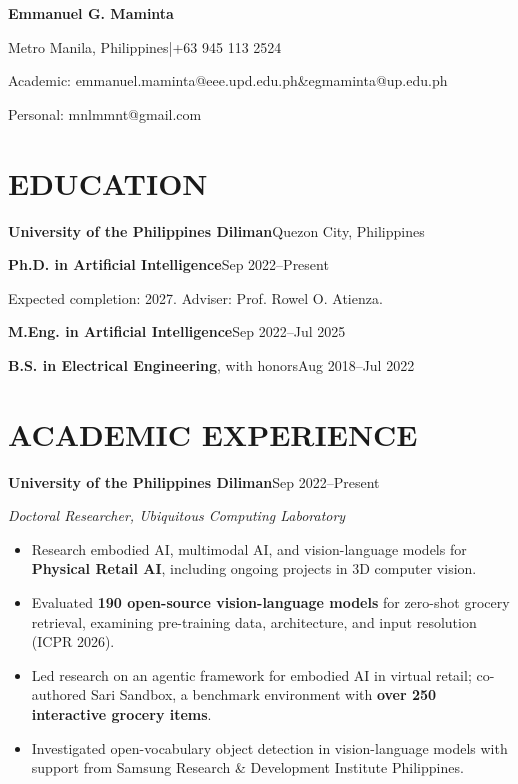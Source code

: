 \documentclass[11pt,a4paper]{article}
\newcommand{\dated}[2]{\textbf{#1}\hfill #2\par}
\newcommand{\role}[3]{\Needspace{4\baselineskip}\dated{#1}{#2}\textit{#3}\par}
\begin{document}
\fontsize{11}{13.2}\selectfont
\raggedright
{}

\begin{center}
  \textbf{Emmanuel G. Maminta}\par
  Metro Manila, Philippines\enspace |\enspace +63 945 113 2524\par
  Academic: emmanuel.maminta@eee.upd.edu.ph\enspace \&\enspace egmaminta@up.edu.ph\par
  Personal: mnlmmnt@gmail.com\par
\end{center}
\vspace{-3pt}

\section{EDUCATION}
\dated{University of the Philippines Diliman}{Quezon City, Philippines}
\textbf{Ph.D. in Artificial Intelligence}\hfill Sep 2022–Present\par
Expected completion: 2027. Adviser: Prof. Rowel O. Atienza.\par
\vspace{3pt}
\textbf{M.Eng. in Artificial Intelligence}\hfill Sep 2022–Jul 2025\par
\textbf{B.S. in Electrical Engineering}, with honors\hfill Aug 2018–Jul 2022\par

\section{ACADEMIC EXPERIENCE}
\role{University of the Philippines Diliman}{Sep 2022–Present}
{Doctoral Researcher, Ubiquitous Computing Laboratory}
\begin{itemize}
  \item Research embodied AI, multimodal AI, and vision-language models for \textbf{Physical Retail AI}, including ongoing projects in 3D computer vision.
  \item Evaluated \textbf{190 open-source vision-language models} for zero-shot grocery retrieval, examining pre-training data, architecture, and input resolution (ICPR 2026).
  \item Led research on an agentic framework for embodied AI in virtual retail; co-authored Sari Sandbox, a benchmark environment with \textbf{over 250 interactive grocery items}.
  \item Investigated open-vocabulary object detection in vision-language models with support from Samsung Research \& Development Institute Philippines.
\end{itemize}
\end{document}
